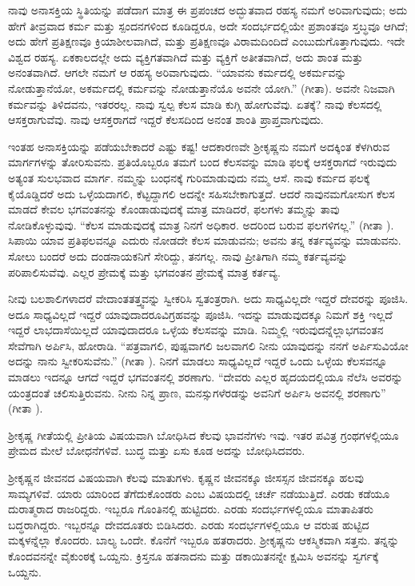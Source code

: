 ನಾವು ಅನಾಸಕ್ತಿಯ ಸ್ಥಿತಿಯನ್ನು ಪಡೆದಾಗ ಮಾತ್ರ ಈ ಪ್ರಪಂಚದ ಅದ್ಭುತವಾದ ರಹಸ್ಯ ನಮಗೆ ಅರಿವಾಗುವುದು; ಅದು ಹೇಗೆ ತೀವ್ರವಾದ ಕರ್ಮ ಮತ್ತು ಸ್ಪಂದನಗಳಿಂದ ಕೂಡಿದ್ದರೂ, ಅದೇ ಸಂದರ್ಭದಲ್ಲಿಯೇ ಪ್ರಶಾಂತವೂ ಸ್ತಬ್ಧವೂ ಆಗಿದೆ; ಅದು ಹೇಗೆ ಪ್ರತಿಕ್ಷಣವೂ ಕ್ರಿಯಾಶೀಲವಾಗಿದೆ, ಮತ್ತು ಪ್ರತಿಕ್ಷಣವೂ ವಿರಾಮದಿಂದಿದೆ ಎಂಬುದು\break ಗೊತ್ತಾಗುವುದು. ಇದೇ ವಿಶ್ವದ ರಹಸ್ಯ. ಏಕಕಾಲದಲ್ಲೇ ಅದು ವ್ಯಕ್ತಿಗತವಾಗಿದೆ ಮತ್ತು ವ್ಯಕ್ತಿಗೆ ಅತೀತವಾಗಿದೆ, ಅದು ಶಾಂತ ಮತ್ತು ಅನಂತವಾಗಿದೆ. ಆಗಲೇ ನಮಗೆ ಆ ರಹಸ್ಯ ಅರಿವಾಗುವುದು. “ಯಾವನು ಕರ್ಮದಲ್ಲಿ ಅಕರ್ಮವನ್ನು ನೋಡುತ್ತಾನೆಯೋ, ಅಕರ್ಮದಲ್ಲಿ ಕರ್ಮವನ್ನು ನೋಡುತ್ತಾನೆಯೊ ಅವನೇ ಯೋಗಿ.” (ಗೀತಾ). ಅವನೇ ನಿಜವಾಗಿ ಕರ್ಮವನ್ನು ತಿಳಿದವನು, ಇತರರಲ್ಲ. ನಾವು ಸ್ವಲ್ಪ ಕೆಲಸ ಮಾಡಿ ಕುಗ್ಗಿ ಹೋಗುವೆವು. ಏತಕ್ಕೆ? ನಾವು ಕೆಲಸದಲ್ಲಿ ಆಸಕ್ತರಾಗುವೆವು. ನಾವು ಆಸಕ್ತರಾಗದೆ ಇದ್ದರೆ ಕೆಲಸದಿಂದ ಅನಂತ ಶಾಂತಿ ಪ್ರಾಪ್ತವಾಗುವುದು.

ಇಂತಹ ಅನಾಸಕ್ತಿಯನ್ನು ಪಡೆಯಬೇಕಾದರೆ ಎಷ್ಟು ಕಷ್ಟ! ಆದಕಾರಣವೇ ಶ‍್ರೀಕೃಷ್ಣನು ನಮಗೆ ಅದಕ್ಕಿಂತ ಕೆಳಗಿರುವ ಮಾರ್ಗಗಳನ್ನು ತೋರಿಸುವನು. ಪ್ರತಿಯೊಬ್ಬರೂ ತಮಗೆ ಬಂದ ಕೆಲಸವನ್ನು ಮಾಡಿ ಫಲಕ್ಕೆ ಆಸಕ್ತರಾಗದೆ ಇರುವುದು ಅತ್ಯಂತ ಸುಲಭವಾದ ಮಾರ್ಗ. ನಮ್ಮನ್ನು ಬಂಧನಕ್ಕೆ ಗುರಿಮಾಡುವುದು ನಮ್ಮ ಆಸೆ. ನಾವು ಕರ್ಮದ ಫಲಕ್ಕೆ ಕೈಯೊಡ್ಡಿದರೆ ಅದು ಒಳ್ಳೆಯದಾಗಲಿ, ಕೆಟ್ಟದ್ದಾಗಲಿ ಅದನ್ನೇ ಸಹಿಸಬೇಕಾಗುತ್ತದೆ. ಆದರೆ ನಾವು\break ನಮಗೋಸುಗ ಕೆಲಸ ಮಾಡದೆ ಕೇವಲ ಭಗವಂತನನ್ನು ಕೊಂಡಾಡುವುದಕ್ಕೆ ಮಾತ್ರ ಮಾಡಿದರೆ, ಫಲಗಳು ತಮ್ಮನ್ನು ತಾವು ನೋಡಿಕೊಳ್ಳುವುವು. “ಕೆಲಸ ಮಾಡುವುದಕ್ಕೆ ಮಾತ್ರ ನಿನಗೆ ಅಧಿಕಾರ. ಅದರಿಂದ ಬರುವ ಫಲಗಳಿಗಲ್ಲ.” (ಗೀತಾ ). ಸಿಪಾಯಿ ಯಾವ ಪ್ರತಿಫಲವನ್ನೂ ಎದುರು ನೋಡದೇ ಕೆಲಸ ಮಾಡುವನು; ಅವನು ತನ್ನ ಕರ್ತವ್ಯವನ್ನು ಮಾಡುವನು. ಸೋಲು ಬಂದರೆ ಅದು ದಂಡನಾಯಕನಿಗೆ ಸೇರಿದ್ದು, ತನಗಲ್ಲ. ನಾವು ಪ್ರೀತಿಗಾಗಿ ನಮ್ಮ ಕರ್ತವ್ಯವನ್ನು ಪರಿಪಾಲಿಸುವೆವು. ಎಲ್ಲರ ಪ್ರೇಮಕ್ಕೆ ಮತ್ತು ಭಗವಂತನ ಪ್ರೇಮಕ್ಕೆ ಮಾತ್ರ ಕರ್ತವ್ಯ.

ನೀವು ಬಲಶಾಲಿಗಳಾದರೆ ವೇದಾಂತತತ್ತ್ವವನ್ನು ಸ್ವೀಕರಿಸಿ ಸ್ವತಂತ್ರರಾಗಿ. ಅದು ಸಾಧ್ಯವಿಲ್ಲದೇ ಇದ್ದರೆ ದೇವರನ್ನು ಪೂಜಿಸಿ. ಅದೂ ಸಾಧ್ಯವಿಲ್ಲದೆ ಇದ್ದರೆ ಯಾವುದಾದರೂ\break ವಿಗ್ರಹವನ್ನು ಪೂಜಿಸಿ. ಇದನ್ನು ಮಾಡುವುದಕ್ಕೂ ನಿಮಗೆ ಶಕ್ತಿ ಇಲ್ಲದೆ ಇದ್ದರೆ ಲಾಭದಾಸೆಯಿಲ್ಲದೆ ಯಾವುದಾದರೂ ಒಳ್ಳೆಯ ಕೆಲಸವನ್ನು ಮಾಡಿ. ನಿಮ್ಮಲ್ಲಿ ಇರುವುದನ್ನೆಲ್ಲಾ\break ಭಗವಂತನ ಸೇವೆಗಾಗಿ ಅರ್ಪಿಸಿ, ಹೋರಾಡಿ. “ಪತ್ರವಾಗಲಿ, ಪುಷ್ಪವಾಗಲಿ ಜಲವಾಗಲಿ ನೀನು ಯಾವುದನ್ನು ನನಗೆ ಅರ್ಪಿಸುವಿಯೋ ಅದನ್ನು ನಾನು ಸ್ವೀಕರಿಸುವೆನು.” (ಗೀತಾ ). ನಿನಗೆ ಮಾಡಲು ಸಾಧ್ಯವಿಲ್ಲದೆ ಇದ್ದರೆ ಒಂದು ಒಳ್ಳೆಯ ಕೆಲಸವನ್ನೂ ಮಾಡಲು ಇದನ್ನೂ ಆಗದೆ ಇದ್ದರೆ ಭಗವಂತನಲ್ಲಿ ಶರಣಾಗು. “ದೇವರು ಎಲ್ಲರ ಹೃದಯದಲ್ಲಿಯೂ ನೆಲೆಸಿ ಅವರನ್ನು ಯಂತ್ರದಂತೆ ಚಲಿಸುತ್ತಿರುವನು. ನೀನು ನಿನ್ನ ಪ್ರಾಣ, ಮನಸ್ಸುಗಳೆರ\-ಡನ್ನು ಅವನಿಗೆ ಅರ್ಪಿಸಿ ಅವನಲ್ಲಿ ಶರಣಾಗು” (ಗೀತಾ ).

ಶ‍್ರೀಕೃಷ್ಣ ಗೀತೆಯಲ್ಲಿ ಪ್ರೀತಿಯ ವಿಷಯವಾಗಿ ಬೋಧಿಸಿದ ಕೆಲವು ಭಾವನೆಗಳು ಇವು. ಇತರ ಪವಿತ್ರ ಗ್ರಂಥಗಳಲ್ಲಿಯೂ ಪ್ರೇಮದ ಮೇಲೆ ಬೋಧನೆಗಳಿವೆ. ಬುದ್ಧ ಮತ್ತು ಏಸು ಕೂಡ ಅದನ್ನು ಬೋಧಿಸಿದವರು.

ಶ‍್ರೀಕೃಷ್ಣನ ಜೀವನದ ವಿಷಯವಾಗಿ ಕೆಲವು ಮಾತುಗಳು. ಕೃಷ್ಣನ ಜೀವನಕ್ಕೂ ಜೀಸಸ್ಸನ ಜೀವನಕ್ಕೂ ಹಲವು ಸಾಮ್ಯಗಳಿವೆ. ಯಾರು ಯಾರಿಂದ ತೆಗೆದುಕೊಂಡರು ಎಂಬ ವಿಷಯ\-ದಲ್ಲಿ ಚರ್ಚೆ ನಡೆಯುತ್ತಿದೆ. ಎರಡು ಕಡೆಯೂ ದುರಾತ್ಮರಾದ ರಾಜರಿದ್ದರು. ಇಬ್ಬರೂ ಗೊಂತಿನಲ್ಲಿ ಹುಟ್ಟಿದರು. ಎರಡು ಸಂದರ್ಭಗಳಲ್ಲಿಯೂ ಮಾತಾಪಿತರು ಬದ್ಧರಾಗಿದ್ದರು. ಇಬ್ಬರನ್ನೂ ದೇವದೂತರು ಬಿಡಿಸಿದರು. ಎರಡು ಸಂದರ್ಭಗಳಲ್ಲಿಯೂ ಆ ವರುಷ ಹುಟ್ಟಿದ ಮಕ್ಕಳನ್ನೆಲ್ಲಾ ಕೊಂದರು. ಬಾಲ್ಯ ಒಂದೇ. ಕೊನೆಗೆ ಇಬ್ಬರೂ ಹತರಾದರು. ಶ‍್ರೀಕೃಷ್ಣನು ಆಕಸ್ಮಿಕವಾಗಿ ಸತ್ತನು. ತನ್ನನ್ನು ಕೊಂದವನನ್ನೇ ವೈಕುಂಠಕ್ಕೆ ಒಯ್ದನು. ಕ್ರಿಸ್ತನೂ ಹತನಾದನು ಮತ್ತು ಡಕಾಯಿತನನ್ನೇ ಕ್ಷಮಿಸಿ ಅವನನ್ನು ಸ್ವರ್ಗಕ್ಕೆ ಒಯ್ದನು.

